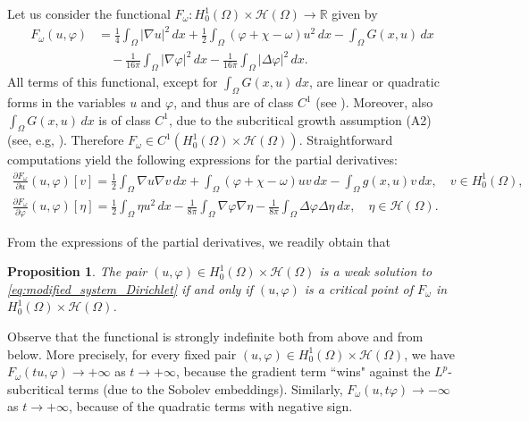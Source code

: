 \documentclass[10pt,a4paper]{amsart}
\numberwithin{equation}{section}
\newtheorem{proposition}[theo]{Proposition}
\begin{document}
Let us consider the functional $F_\omega: H_0^1(\Omega) \times \mathcal{H}(\Omega) \to \mathbb R$ given by
\begin{align*}
 F_\omega(u, \varphi)
 & = \frac{1}{4} \int_\Omega |\nabla u|^2 \,dx 
 + \frac{1}{2} \int_\Omega (\varphi + \chi - \omega) u^2 \,dx 
 - \int_\Omega G(x, u) \,dx  \\
 & \quad - \frac{1}{16 \pi} \int_\Omega |\nabla \varphi|^2 \,dx 
 - \frac{1}{16 \pi} \int_\Omega |\Delta \varphi|^2 \,dx.
\end{align*}
All terms of this functional, except for $\int_\Omega G(x, u) \,dx$, are linear 
or quadratic forms in the variables $u$ and $\varphi$, and thus are of class 
$C^1$ (see \cite{BadialeSerra2011}). Moreover, also $\int_\Omega G(x, u) \,dx$ 
is of class $C^1$, due to the subcritical growth assumption (A2)
(see, e.g, \cite[Appendix B]{Rabinowitz1986}). 
Therefore $F_\omega \in C^1(H_0^1(\Omega) \times \mathcal{H}(\Omega))$.
Straightforward computations yield the following expressions for the partial 
derivatives:
\begin{gather}
  \frac{\partial F_\omega}{\partial u}(u, \varphi)[v] 
 = \frac{1}{2} \int_\Omega \nabla u \nabla v \,dx 
  + \int_\Omega (\varphi + \chi - \omega) u v \,dx 
  - \int_\Omega g(x, u) v \,dx, \quad v \in H_0^1(\Omega), \label{eq:F_u} \\
  \frac{\partial F_\omega}{\partial \varphi}(u, \varphi)[\eta] = \frac{1}{2} 
  \int_\Omega \eta u^2 \,dx - \frac{1}{8\pi} \int_\Omega \nabla \varphi \nabla \eta 
  - \frac{1}{8\pi} \int_\Omega \Delta \varphi \Delta \eta \,dx, \quad \eta \in \mathcal{H}(\Omega). \label{eq:F_varphi}
\end{gather}

From the expressions of the partial derivatives, we readily obtain that

\begin{proposition}
 \label{prop:variational_formulation_Dirichlet}
 The pair $(u, \varphi) \in H_0^1(\Omega) \times \mathcal{H}(\Omega) $ is a weak solution to
\eqref{eq:modified_system_Dirichlet} if and only if $(u, \varphi)$ is a critical point 
of $F_\omega$ in $H_0^1(\Omega) \times \mathcal{H}(\Omega) $.
\end{proposition}

Observe that the functional is strongly indefinite both from above and from below. 
More precisely, for every fixed pair $(u, \varphi) \in H_0^1(\Omega) \times \mathcal{H}(\Omega) $, we
have $F_\omega(tu, \varphi) \to + \infty$ as $t \to + \infty$, because the gradient 
term ``wins" against the $L^p$-subcritical terms (due to the Sobolev embeddings). 
Similarly, $F_\omega(u, t \varphi) \to - \infty$ as $t \to + \infty$, because of the 
quadratic terms with negative sign.
\end{document}
